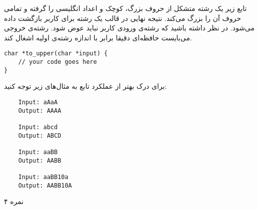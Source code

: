 
تابع زیر یک رشته متشکل از حروف بزرگ، کوچک و اعداد انگلیسی را گرفته
و تمامی حروف آن را بزرگ می‌کند. نتیجه نهایی در قالب یک رشته برای کاربر بازگشت داده می‌شود.
در نظر داشته باشید که رشته‌ی ورودی کاربر نباید عوض شود.
رشته‌ی خروجی می‌بایست حافظه‌ای دقیقا برابر با اندازه رشته‌ی اولیه اشغال کند.

\begin{latin}
\begin{verbatim}
char *to_upper(char *input) {
    // your code goes here
}
\end{verbatim}
\end{latin}

برای درک بهتر از عملکرد تابع به مثال‌های زیر توجه کنید:

\begin{latin}
\begin{verbatim}
    Input: aAaA
    Output: AAAA

    Input: abcd
    Output: ABCD

    Input: aaBB
    Output: AABB

    Input: aaBB10a
    Output: AABB10A
\end{verbatim}
\end{latin}

۴ نمره


